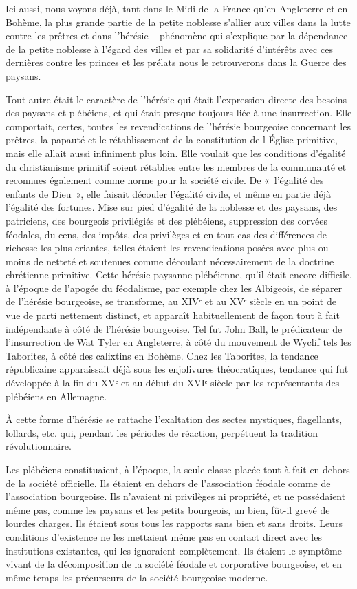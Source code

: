 \documentclass[french,twoside]{book} %
\begin{document}
Ici aussi, nous voyons déjà, tant dans le Midi de la France qu’en Angleterre et en Bohème, la plus grande partie de la petite noblesse s’allier aux villes dans la lutte contre les prêtres et dans l’hérésie – phénomène qui s’explique par la dépendance de la petite noblesse à l’égard des villes et par sa solidarité d’intérêts avec ces dernières contre les princes et les prélats nous le retrouverons dans la Guerre des paysans.\par
Tout autre était le caractère de l’hérésie qui était l’expression directe des besoins des paysans et plébéiens, et qui était presque toujours liée à une insurrection. Elle comportait, certes, toutes les revendications de l’hérésie bourgeoise concernant les prêtres, la papauté et le rétablissement de la constitution de l Église primitive, mais elle allait aussi infiniment plus loin. Elle voulait que les conditions d’égalité du christianisme primitif soient rétablies entre les membres de la communauté et reconnues également comme norme pour la société civile. De « l’égalité des enfants de Dieu », elle faisait découler l’égalité civile, et même en partie déjà l’égalité des fortunes. Mise sur pied d’égalité de la noblesse et des paysans, des patriciens, des bourgeois privilégiés et des plébéiens, suppression des corvées féodales, du cens, des impôts, des privilèges et en tout cas des différences de richesse les plus criantes, telles étaient les revendications posées avec plus ou moins de netteté et soutenues comme découlant nécessairement de la doctrine chrétienne primitive. Cette hérésie paysanne-plébéienne, qu’il était encore difficile, à l’époque de l’apogée du féodalisme, par exemple chez les Albigeois, de séparer de l’hérésie bourgeoise, se transforme, au XIVᵉ et au XVᵉ siècle en un point de vue de parti nettement distinct, et apparaît habituellement de façon tout à fait indépendante à côté de l’hérésie bourgeoise. Tel fut John Ball, le prédicateur de l’insurrection de Wat Tyler en Angleterre, à côté du mouvement de Wyclif tels les Taborites, à côté des calixtins en Bohème. Chez les Taborites, la tendance républicaine apparaissait déjà sous les enjolivures théocratiques, tendance qui fut développée à la fin du XVᵉ et au début du XVIᵉ siècle par les représentants des plébéiens en Allemagne.\par
À cette forme d’hérésie se rattache l’exaltation des sectes mystiques, flagellants, lollards, etc. qui, pendant les périodes de réaction, perpétuent la tradition révolutionnaire.\par
Les plébéiens constituaient, à l’époque, la seule classe placée tout à fait en dehors de la société officielle. Ils étaient en dehors de l’association féodale comme de l’association bourgeoise. Ils n’avaient ni privilèges ni propriété, et ne possédaient même pas, comme les paysans et les petits bourgeois, un bien, fût-il grevé de lourdes charges. Ils étaient sous tous les rapports sans bien et sans droits. Leurs conditions d’existence ne les mettaient même pas en contact direct avec les institutions existantes, qui les ignoraient complètement. Ils étaient le symptôme vivant de la décomposition de la société féodale et corporative bourgeoise, et en même temps les précurseurs de la société bourgeoise moderne.\par
\end{document}
